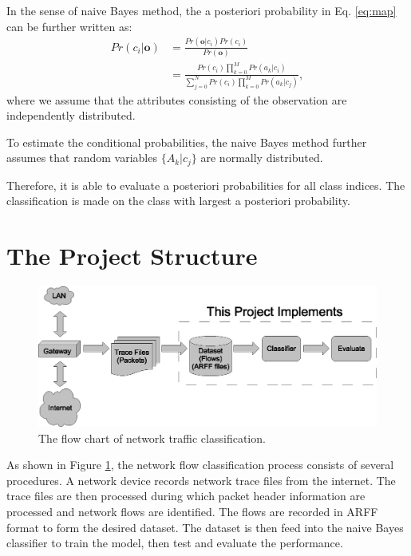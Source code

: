 \documentclass[a4paper,12pt]{article}
\begin{document}
In the sense of naive Bayes method, the a posteriori probability in Eq. \ref{eq:map} can be further written as:
\begin{align}
    Pr(c_i|\mathbf{o}) & = \frac{Pr(\mathbf{o}|c_i)Pr(c_i)}{Pr(\mathbf{o})} \\
    & = \frac{ Pr(c_i) \prod_{k=0}^{M} { Pr(a_k|c_i) } } { \sum_{j=0}^{N} {Pr(c_i) \prod_{k=0}^{M}{Pr(a_k|c_j)} }},
\end{align}
where we assume that the attributes consisting of the observation are independently distributed.

To estimate the conditional probabilities, the naive Bayes method further assumes that random variables $\{A_k|c_j\}$ are normally distributed.

Therefore, it is able to evaluate a posteriori probabilities for all class indices. The classification is made on the class with largest a posteriori probability.

\section{The Project Structure}
\begin{figure}[tbp]
    \centering
    \includegraphics[width=1.1\textwidth]{pic/flow_chart.eps}
    \caption{The flow chart of network traffic classification.}
    \label{fig:flow_chart}
\end{figure} 

As shown in Figure \ref{fig:flow_chart}, the network flow classification process consists of several procedures. A network device records network trace files from the internet. The trace files are then processed during which packet header information are processed and network flows are identified. The flows are recorded in ARFF format to form the desired dataset. The dataset is then feed into the naive Bayes classifier to train the model, then test and evaluate the performance.
\end{document}
